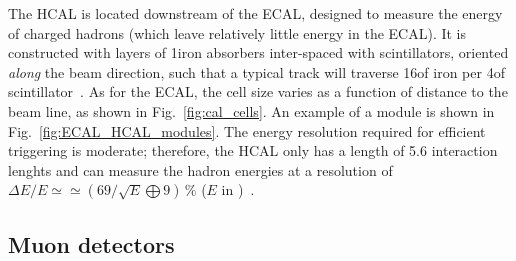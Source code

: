 The HCAL is located downstream of the ECAL, designed to measure the energy of charged hadrons (which leave relatively little energy in the ECAL). It is constructed with layers of 1\cm iron absorbers inter-spaced with scintillators, oriented \emph{along} the beam direction, such that a typical track will traverse 16\mm of iron per 4\mm of scintillator~\cite{CAL-TDR}. As for the ECAL, the cell size varies as a function of distance to the beam line, as shown in Fig.~\ref{fig:cal_cells}. An example of a module is shown in Fig.~\ref{fig:ECAL_HCAL_modules}.  The energy resolution required for efficient triggering is moderate; therefore,  the HCAL only has a length of 5.6 interaction lenghts and can measure the hadron energies at a resolution of $\Delta E/E\simeq \simeq (69/\sqrt{E} \bigoplus 9)\,\%$ ($E$ in \gevcc)~\cite{LHCb-detector}.


\subsection{Muon detectors} %
\label{sub:muon_detectors}

